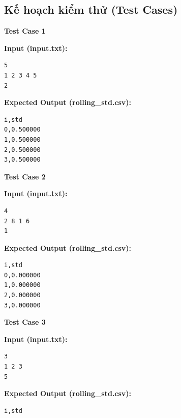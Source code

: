 \subsection{Kế hoạch kiểm thử (Test Cases)}

\textbf{Test Case 1}

\textbf{Input (input.txt):}
\begin{lstlisting}
5
1 2 3 4 5
2
\end{lstlisting}

\textbf{Expected Output (rolling\_std.csv):}
\begin{lstlisting}
i,std
0,0.500000
1,0.500000
2,0.500000
3,0.500000
\end{lstlisting}

\textbf{Test Case 2}

\textbf{Input (input.txt):}
\begin{lstlisting}
4
2 8 1 6
1
\end{lstlisting}

\textbf{Expected Output (rolling\_std.csv):}
\begin{lstlisting}
i,std
0,0.000000
1,0.000000
2,0.000000
3,0.000000
\end{lstlisting}

\textbf{Test Case 3}

\textbf{Input (input.txt):}
\begin{lstlisting}
3
1 2 3
5
\end{lstlisting}

\textbf{Expected Output (rolling\_std.csv):}
\begin{lstlisting}
i,std
\end{lstlisting}